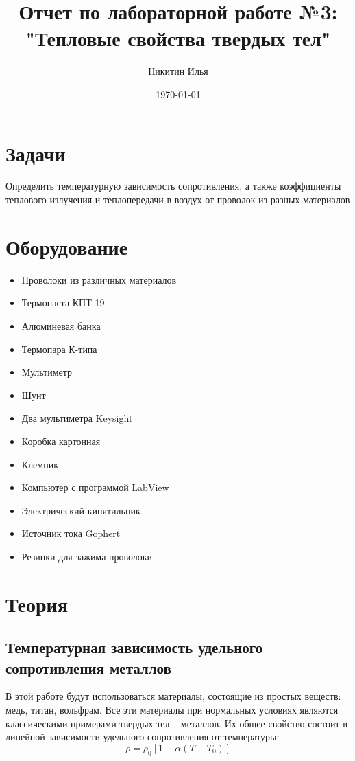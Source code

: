 \documentclass[a4paper,14pt]{extarticle}
\author{Никитин Илья}
\title{Отчет по лабораторной работе №3: "Тепловые свойства твердых тел"}
\date{\today}
\begin{document}
	
	\maketitle
	\tableofcontents

	\section{Задачи}
		Определить температурную зависимость сопротивления, а также коэффициенты теплового излучения и теплопередачи в воздух от проволок из разных материалов
	\section{Оборудование}
		\begin{itemize}
			\item Проволоки из различных материалов
			\item Термопаста КПТ-19
			\item Алюминевая банка
			\item Термопара К-типа
			\item Мультиметр
			\item Шунт
			\item Два мультиметра Keysight
			\item Коробка картонная
			\item Клемник
			\item Компьютер с программой LabView
			\item Электрический кипятильник
			\item Источник тока Gophert
			\item Резинки для зажима проволоки
		\end{itemize}
	\section{Теория}
		\subsection{Температурная зависимость удельного сопротивления металлов}
			В этой работе будут использоваться материалы, состоящие из простых веществ: медь, титан, вольфрам. Все эти материалы при нормальных условиях являются классическими примерами твердых тел -- металлов. Их общее свойство состоит в линейной зависимости удельного сопротивления от температуры:
			\begin{equation}
				\rho = \rho_0 [1 + \alpha(T - T_0)]
				\end{equation}
\end{document}
